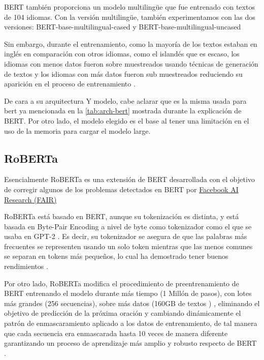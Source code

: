 BERT también proporciona un modelo multilingüe que fue entrenado con textos de 104 idiomas. Con la versión multilingüe, también experimentamos con las dos versiones: BERT-base-multilingual-cased \cite{bert-base-multilingual-cased} y BERT-base-multilingual-uncased \cite{bert-base-multilingual-uncased}

Sin embargo, durante el entrenamiento, como la mayoría de los textos estaban en inglés en comparación con otros idiomas, como el islandés que es escaso, los idiomas con menos datos fueron sobre muestreados usando técnicas de generación de textos y los idiomas con más datos fueron sub muestreados reduciendo su aparición en el proceso de entrenamiento \cite{pires2019multilingual}.

De cara a su arquitectura Y modelo, cabe aclarar que es la misma usada para bert ya mencionada en la \autoref{tab:arch-bert} mostrada durante la explicación de BERT. Por otro lado, el modelo elegido es el base al tener una limitación en el uso de la memoria para cargar el modelo large.


\subsection{RoBERTa}

Esencialmente RoBERTa es una extensión de BERT desarrollada con el objetivo de corregir algunos de los problemas detectados en BERT por \href{https://ai.facebook.com/research/}{Facebook AI Research (FAIR)}

RoBERTa está basado en BERT, aunque su tokenización es distinta, y está basada en Byte-Pair Encoding a nivel de byte como tokenizador como el que se usaba en GPT-2 \cite{GPT2}. Es decir, su tokenizador se asegura de que las palabras más frecuentes se representen usando un solo token mientras que las menos comunes se separan en tokens más pequeños, lo cual ha demostrado tener buenos rendimientos \cite{galle2019investigating}. 

Por otro lado, RoBERTa modifica el procedimiento de preentrenamiento de BERT entrenando el modelo durante más tiempo (1 Millón de pasos), con lotes más grandes (256 secuencias), sobre más datos (160GB de textos \cite{roberta-intro}) , eliminando el objetivo de predicción de la próxima oración y cambiando dinámicamente el patrón de enmascaramiento aplicado a los datos de entrenamiento, de tal manera que cada secuencia era enmascarada hasta 10 veces de manera diferente garantizando un proceso de aprendizaje más amplio y robusto respecto de BERT \cite{liu2019roberta}.

